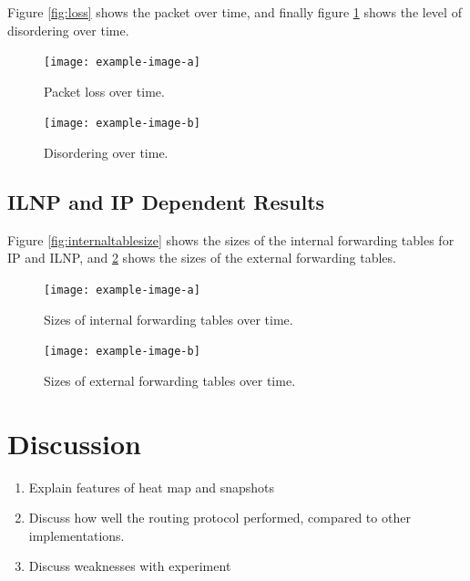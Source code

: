 \documentclass[12pt]{article}
\begin{document}
Figure \ref{fig:loss} shows the packet over time, and finally figure \ref{fig:dis} shows the level of disordering over time.

\begin{figure}[!ht]
    \centering
    \begin{minipage}{0.45\textwidth}
        \centering
        \texttt{[image: example-image-a]} %
        \caption{Packet loss over time.}
        \label{fig:loss}
    \end{minipage}\hfill
    \begin{minipage}{0.45\textwidth}
        \centering
        \texttt{[image: example-image-b]} %
        \caption{Disordering over time.}
        \label{fig:dis}
    \end{minipage}\hfill
\end{figure}

\FloatBarrier
\subsection{ILNP and IP Dependent Results}

Figure \ref{fig:internaltablesize} shows the sizes of the internal forwarding tables for IP and ILNP, and \ref{fig:externaltablesize} shows the sizes of the external forwarding tables.

\begin{figure}[!ht]
    \centering
    \begin{minipage}{0.45\textwidth}
        \centering
        \texttt{[image: example-image-a]} %
        \caption{Sizes of internal forwarding tables over time.}
        \label{fig:internaltablesize}
    \end{minipage}\hfill
    \begin{minipage}{0.45\textwidth}
        \centering
        \texttt{[image: example-image-b]} %
        \caption{Sizes of external forwarding tables over time.}
        \label{fig:externaltablesize}
    \end{minipage}\hfill
\end{figure}

\FloatBarrier

\section{Discussion}

\begin{enumerate}
\item Explain features of heat map and snapshots
\item Discuss how well the routing protocol performed, compared to other implementations. 
\item Discuss weaknesses with experiment
\end{enumerate}
\end{document}
